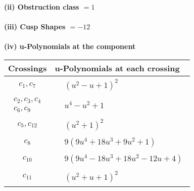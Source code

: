 \documentclass[1p]{elsarticle_modified}
\theoremstyle{definition}
\begin{document}
\flushleft \textbf{(ii) Obstruction class $= 1$}\\~\\
\flushleft \textbf{(iii) Cusp Shapes $= -12$}\\~\\
\newpage\renewcommand{\arraystretch}{1}
\flushleft \textbf{(iv) u-Polynomials at the component}\newline \\
\begin{tabular}{m{50pt}|m{274pt}}
Crossings & \hspace{64pt}u-Polynomials at each crossing \\
\hline $$\begin{aligned}c_{1},c_{7}\end{aligned}$$&$\begin{aligned}
&(u^2- u+1)^2
\end{aligned}$\\
\hline $$\begin{aligned}c_{2},c_{3},c_{4}\\c_{6},c_{9}\end{aligned}$$&$\begin{aligned}
&u^4- u^2+1
\end{aligned}$\\
\hline $$\begin{aligned}c_{5},c_{12}\end{aligned}$$&$\begin{aligned}
&(u^2+1)^2
\end{aligned}$\\
\hline $$\begin{aligned}c_{8}\end{aligned}$$&$\begin{aligned}
&9(9 u^4+18 u^3+9 u^2+1)
\end{aligned}$\\
\hline $$\begin{aligned}c_{10}\end{aligned}$$&$\begin{aligned}
&9(9 u^4-18 u^3+18 u^2-12 u+4)
\end{aligned}$\\
\hline $$\begin{aligned}c_{11}\end{aligned}$$&$\begin{aligned}
&(u^2+u+1)^2
\end{aligned}$\\
\hline
\end{tabular}\\~\\
\end{document}
